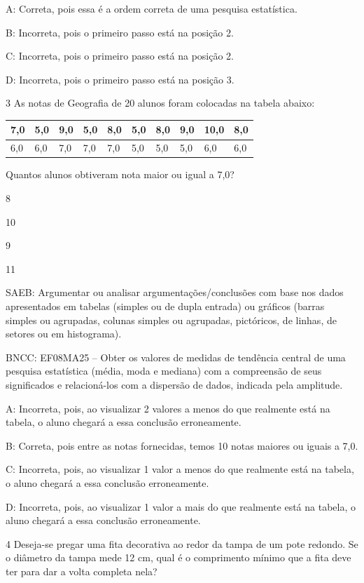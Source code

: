 {A: Correta, pois essa é a ordem correta de uma pesquisa estatística.

B: Incorreta, pois o primeiro passo está na posição 2.

C: Incorreta, pois o primeiro passo está na posição 2.

D: Incorreta, pois o primeiro passo está na posição 3.

\num{3} As notas de Geografia de 20 alunos foram colocadas na tabela abaixo:


\begin{longtable}[]{@{}llllllllll@{}}
\toprule
7,0 & 5,0 & 9,0 & 5,0 & 8,0 & 5,0 & 8,0 & 9,0 & 10,0 &
8,0\tabularnewline
\midrule
\endhead
6,0 & 6,0 & 7,0 & 7,0 & 7,0 & 5,0 & 5,0 & 5,0 & 6,0 & 6,0\tabularnewline
\bottomrule
\end{longtable}

Quantos alunos obtiveram nota maior ou igual a 7,0?
\item 8
\item 10
\item 9
\item 11

SAEB: Argumentar ou analisar argumentações/conclusões com base nos dados
apresentados em tabelas (simples ou de dupla entrada) ou gráficos
(barras simples ou agrupadas, colunas simples ou agrupadas, pictóricos,
de linhas, de setores ou em histograma).

BNCC: EF08MA25 -- Obter os valores de medidas de tendência central de
uma pesquisa estatística (média, moda e mediana) com a compreensão de
seus significados e relacioná-los com a dispersão de dados, indicada
pela amplitude.

A: Incorreta, pois, ao visualizar 2 valores a menos do que realmente
está na tabela, o aluno chegará a essa conclusão erroneamente.

B: Correta, pois entre as notas fornecidas, temos 10 notas maiores ou
iguais a 7,0.

C: Incorreta, pois, ao visualizar 1 valor a menos do que realmente está
na tabela, o aluno chegará a essa conclusão erroneamente.

D: Incorreta, pois, ao visualizar 1 valor a mais do que realmente está
na tabela, o aluno chegará a essa conclusão erroneamente.

\num{4} Deseja-se pregar uma fita decorativa ao redor da tampa de um pote
redondo. Se o diâmetro da tampa mede 12 cm, qual é o comprimento mínimo
que a fita deve ter para dar a volta completa nela?

}
